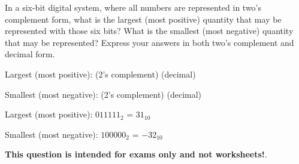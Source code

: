 

In a six-bit digital system, where all numbers are represented in two's complement form, what is the largest (most positive) quantity that may be represented with those six bits?  What is the smallest (most negative) quantity that may be represented?  Express your answers in both two's complement and decimal form.

\vskip 10pt

\noindent
Largest (most positive): \hskip 10pt \underbar{\hskip 80pt} (2's complement) \hskip 40pt \underbar{\hskip 80pt} (decimal)

\vskip 10pt

\noindent
Smallest (most negative): \hskip 10pt \underbar{\hskip 80pt} (2's complement) \hskip 40pt \underbar{\hskip 80pt} (decimal)







Largest (most positive): $011111_2$ = $31_{10}$

\vskip 10pt

Smallest (most negative): $100000_2$ = $-32_{10}$







{\bf This question is intended for exams only and not worksheets!}.




